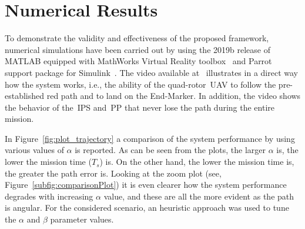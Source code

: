 

\section{Numerical Results}
\label{sec:simulationsResults}

To demonstrate the validity and effectiveness of the proposed framework, numerical simulations have been carried out by using the 2019b release of MATLAB equipped with MathWorks Virtual Reality toolbox~\cite{16_Mathworks_url} and Parrot support package for Simulink~\cite{15_Mathworks_url}. The video available at~\cite{YouTubeVideo} illustrates in a direct way how the system works, i.e., the ability of the quad-rotor~\gls{UAV} to follow the pre-established red path and to land on the End-Marker. In addition, the video shows the behavior of the~\gls{IPS} and~\gls{PP} that never lose the path during the entire mission. 

In Figure~\ref{fig:plot_trajectory} a comparison of the system performance by using various values of $\alpha$ is reported. As can be seen from the plots, the larger $\alpha$ is, the lower the mission time ($T_s$) is. On the other hand, the lower the mission time is, the greater the path error is. Looking at the zoom plot (see, Figure~\ref{subfig:comparisonPlot}) it is even clearer how the system performance degrades with increasing $\alpha$ value, and these are all the more evident as the path is angular. For the considered scenario, an heuristic approach was used to tune the $\alpha$ and $\beta$ parameter values.



